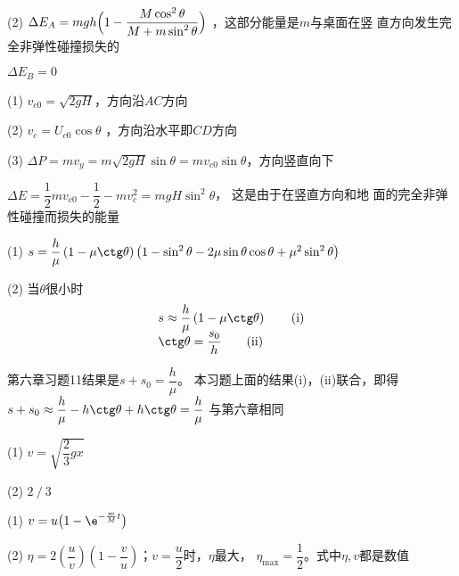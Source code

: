 \documentclass[../outline-of-mechanics.tex]{subfiles}
\begin{document}
(2) $\Delta E_{A}=m g h\Bigl(1-\dfrac{M \cos ^{2} \theta}{M+m \sin ^{2} \theta} \Bigr)$
，这部分能量是$ m $与桌面在竖
直方向发生完全非弹性碰撞损失的

\aindent $ \Delta E _ { B } = 0 $

\answer (1) $ v _ { c0 } = \sqrt { 2 g H } $，方向沿$ AC $方向

(2) $ v _ { c } = U _ { c0 } \cos \theta $ ，方向沿水平即$ CD $方向

(3) $ \Delta P = m v _ { y } = m \sqrt { 2 g H } \sin \theta = m v _ { c0 } \sin \theta $，方向竖直向下

$ \Delta E = \dfrac { 1 } { 2 } m v _ { c0 } - \dfrac { 1 } { 2 } - m v _ { c } ^ { 2 } = m g H \sin ^ { 2 } \theta $， 这是由于在竖直方向和地
面的完全非弹性碰撞而损失的能量

\answer (1) $ s = \dfrac { h } { \mu } \left( 1 - \mu \ctg \theta \right) \left( 1 - \sin ^ 2 \theta - 2 \mu \sin \theta \cos \theta + \mu ^ { 2 } \sin ^ { 2 } \theta \right) $

(2) 当$ \theta $很小时%
\begin{align}
   & s \approx \frac { h } { \mu } \left( 1 - \mu \ctg \theta \right) \tag{i} \\[-0.5em]
   & \ctg \theta = \frac { s _ { 0 } } { h } \tag{ii}
\end{align}

第六章习题11结果是$ s + s _ { 0 } = \dfrac { h } { \mu } $。
本习题上面的结果(i)，(ii)联合，即得
$ s + s _ { 0 } \approx \dfrac { h } { \mu } - h \ctg \theta + h \ctg \theta = \dfrac { h } { \mu } $
与第六章相同

\answer (1) $ v = \sqrt { \dfrac{ 2 } { 3 } g x } $

(2) $ 2 \operatorname{/} 3 $

\answer (1) $ v = u \bigl( 1 - \e ^ { - \frac { m } { M } t } \bigr) $

(2) $ \eta = 2 \left( \dfrac { u } { v } \right) \left( 1 - \dfrac { v } { u } \right) $；$ v = \dfrac { u } { 2 } $时，$\eta$最大， $ \eta _ { \text{max}} = \dfrac { 1 } { 2 } $。式中$ \eta, v $都是数值
\end{document}
